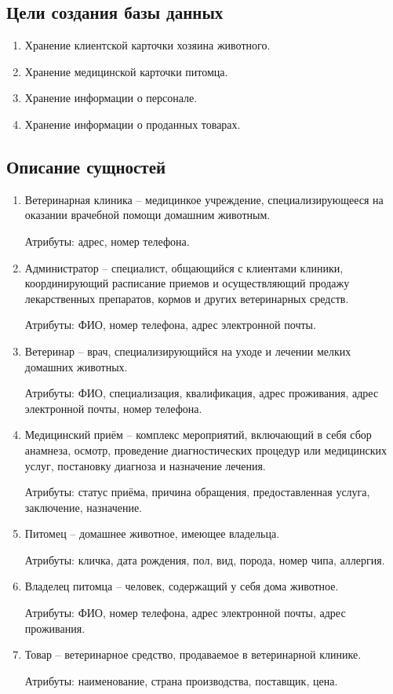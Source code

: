 \documentclass[a4paper]{article}
\begin{document}
\subsection {Цели создания базы данных}
\begin{enumerate}
	\item Хранение клиентской карточки хозяина животного.
	\item Хранение медицинской карточки питомца.
	\item Хранение информации о персонале.
	\item Хранение информации о проданных товарах.
\end{enumerate}

\subsection {Описание сущностей}
\begin{enumerate}
\item Ветеринарная клиника -- медицинкое учреждение, специализирующееся на оказании врачебной помощи домашним животным.

Атрибуты: адрес, номер телефона.

\item Администратор -- специалист, общающийся с клиентами клиники, координирующий расписание приемов и осуществляющий продажу лекарственных препаратов, кормов и других ветеринарных средств. 

Атрибуты: ФИО, номер телефона, адрес электронной почты.

\item Ветеринар -- врач, специализирующийся на уходе и лечении мелких домашних животных. 

Атрибуты: ФИО, специализация, квалификация, адрес проживания, адрес электронной почты, номер телефона. 

\item Медицинский приём -- комплекс мероприятий, включающий в себя сбор анамнеза, осмотр, проведение диагностических процедур или медицинских услуг, постановку диагноза и назначение лечения.

Атрибуты: статус приёма, причина обращения, предоставленная услуга, заключение, назначение.

\item Питомец -- домашнее животное, имеющее владельца.

Атрибуты: кличка, дата рождения, пол, вид, порода, номер чипа, аллергия.

\item Владелец питомца -- человек, содержащий у себя дома животное.

Атрибуты: ФИО, номер телефона, адрес электронной почты, адрес проживания.

\item Товар -- ветеринарное средство, продаваемое в ветеринарной клинике.

Атрибуты: наименование, страна производства, поставщик, цена.
\end{enumerate}
\end{document}
